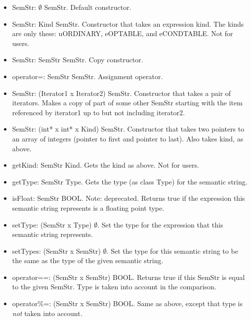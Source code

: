 \begin{itemize}
\item   SemStr: $\emptyset$ \ra SemStr.
    Default constructor.

\item   SemStr: Kind \ra SemStr.
    Constructor that takes an expression kind. The kinds are only these:
    uORDINARY, eOPTABLE, and eCONDTABLE. Not for users.

\item   SemStr: SemStr \ra SemStr.
    Copy constructor.

\item   operator=: SemStr \ra SemStr.
    Assignment operator.

\item   SemStr: (Iterator1 x Iterator2) \ra SemStr.
    Constructor that takes a pair of iterators. Makes a copy of part
    of some other SemStr starting with the item referenced by iterator1
    up to but not including iterator2.

\item   SemStr: (int* x int* x Kind) \ra SemStr.
    Constructor that takes two pointers to an array of integers (pointer to
    first and pointer to last). Also takes kind, as above.

\item   getKind: SemStr \ra Kind.
    Gets the kind as above. Not for users.

\item   getType: SemStr \ra Type.
    Gets the type (as class Type) for the semantic string.

\item   isFloat: SemStr \ra BOOL.
    Note: deprecated. Returns true if the expression this semantic string
    represents is a floating point type.

\item   setType: (SemStr x Type) \ra $\emptyset$.
    Set the type for the expression that this semantic string represents.

\item   setTypes: (SemStr x SemStr) \ra $\emptyset$.
    Set the type for this semantic string to be the same as the type of the
    given semantic string.

\item   operator==: (SemStr x SemStr) \ra BOOL.
    Returns true if this SemStr is equal to the given SemStr. Type is taken
    into account in the comparison.

\item   operator\%=: (SemStr x SemStr) \ra BOOL.
    Same as above, except that type is \emph{not} taken into account.


\end{itemize}
